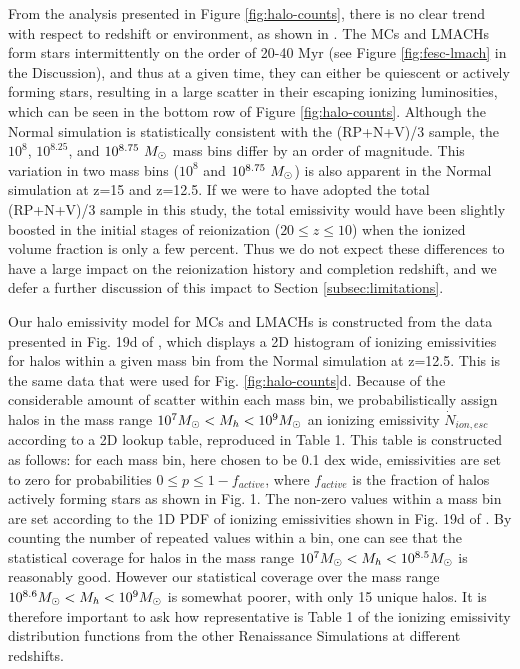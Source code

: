 \documentclass[iop,apj]{emulateapj}
\begin{document}
From the analysis presented in Figure \ref{fig:halo-counts}, there is no clear trend with respect to redshift or environment, as shown in \citet{Xu16}.  The MCs and LMACHs form stars intermittently on the order of 20-40 Myr (see Figure \ref{fig:fesc-lmach} in the Discussion), and thus at a given time, they can either be quiescent or actively forming stars, resulting in a large scatter in their escaping ionizing luminosities, which can be seen in the bottom row of Figure \ref{fig:halo-counts}.  Although the Normal simulation is statistically consistent with the (RP+N+V)/3 sample, the $10^{8}$, $10^{8.25}$, and $10^{8.75}~\Ms$ mass bins differ by an order of magnitude.  This variation in two mass bins ($10^8$ and $10^{8.75}~\Ms$) is also apparent in the Normal simulation at z=15 and z=12.5.  If we were to have adopted the total (RP+N+V)/3 sample in this study, the total emissivity would have been slightly boosted in the initial stages of reionization ($20 \leq z \leq 10$) when the ionized volume fraction is only a few percent.  Thus we do not expect these differences to have a large impact on the reionization history and completion redshift, and we defer a further discussion of this impact to Section \ref{subsec:limitations}.

Our halo emissivity model for MCs and LMACHs is constructed from the data presented in Fig. 19d of \cite{Xu16}, which displays a 2D histogram of ionizing emissivities for halos within a given mass bin from the Normal simulation at z=12.5. This is the same data that were used for Fig. \ref{fig:halo-counts}d.  Because of the considerable amount of scatter within each mass bin, we probabilistically assign halos in the mass range $10^7\Ms<\mh<10^9\Ms$ an ionizing emissivity $\dot{N}_{ion,esc}$ according to a 2D lookup table, reproduced in Table 1. This table is constructed as follows: for each mass bin, here chosen to be 0.1 dex wide, emissivities are set to zero for probabilities $0\leq p \leq 1- f_{active}$, where $f_{active}$ is the fraction of halos actively forming stars as shown in Fig. 1. The non-zero values within a mass bin are set according to the 1D PDF of ionizing emissivities shown in Fig. 19d of  \cite{Xu16}. By counting the number of repeated values within a bin, one can see that the statistical coverage for halos in the mass range $10^7\Ms<\mh<10^{8.5}\Ms$ is reasonably good. However our statistical coverage over the mass range $10^{8.6}\Ms<\mh<10^9\Ms$ is somewhat poorer, with only 15 unique halos. It is therefore important to ask how representative is Table 1 of the ionizing emissivity distribution functions from the other Renaissance Simulations at different redshifts. 
\end{document}
